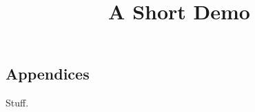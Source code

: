 \documentclass[article]{jss}
\title{A Short Demo}
\begin{document}
\begin{appendix}
\section*{Appendices}
Stuff.
\end{appendix}
\end{document}
